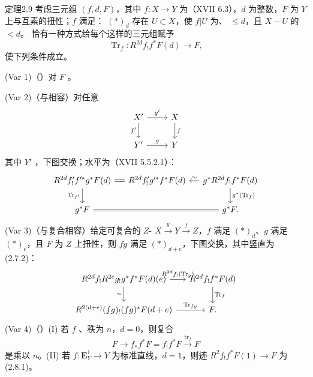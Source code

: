 \begin{SGAresult}{定理}{2.9}
考虑三元组 $(f,d,F)$，其中 $f:X\to Y$ 为（XVII 6.3），$d$ 为整数，$F$ 为 $Y$ 上与互素的扭性；$f$ 满足：
$(*)_d$ 存在 $U\subset X$，使 $f|U$ 为、 $\le d$，且 $X-U$ 的 $<d$。
恰有一种方式给每个这样的三元组赋予
\[\operatorname{Tr}_f:R^{2d}f_!f^*F(d)\to F,\]
使下列条件成立。

(Var 1)（）对 $F$ 。

(Var 2)（与相容）对任意
\[\begin{tikzcd}X'\arrow[r,"g'"]\arrow[d,"f'"']&X\arrow[d,"f"]\\Y'\arrow[r,"g"]&Y\end{tikzcd}\]
其中 $Y'$ ，下图交换；水平为（XVII 5.5.2.1）：
\[\begin{tikzcd}[column sep=small]
R^{2d}f'_!f'^*g^*F(d)\arrow[r,equal]\arrow[d,"\operatorname{Tr}_{f'}"']&R^{2d}f'_!g'^*f^*F(d)&g^*R^{2d}f_!f^*F(d)\arrow[l,"\sim"']\arrow[d,"g^*(\operatorname{Tr}_f)"]\\
g^*F\arrow[rr,equal]&&g^*F.
\end{tikzcd}\]
(Var 3)（与复合相容）给定可复合的 $Z$- $X\xrightarrow gY\xrightarrow fZ$，$f$ 满足 $(*)_d$、$g$ 满足 $(*)_e$，且 $F$ 为 $Z$ 上扭性，则 $fg$ 满足 $(*)_{d+e}$，下图交换，其中竖直为 (2.7.2)：
\[\begin{tikzcd}[column sep=small]
R^{2d}f_!R^{2e}g_!g^*f^*F(d)(e)\arrow[r,"R^{2d}f_!(\operatorname{Tr}_g)"]\arrow[d,"\sim"']&R^{2d}f_!f^*F(d)\arrow[d,"\operatorname{Tr}_f"]\\
R^{2(d+e)}(fg)_!(fg)^*F(d+e)\arrow[r,"\operatorname{Tr}_{fg}"]&F.
\end{tikzcd}\]
(Var 4)（）(I) 若 $f$ 、秩为 $n$，$d=0$，则复合
\[F\to f_*f^*F=f_!f^*F\xrightarrow{\operatorname{tr}_f}F\]
是乘以 $n$。(II) 若 $f:\mathbf E^1_Y\to Y$ 为标准直线，$d=1$，则迹 $R^2f_!f^*F(1)\to F$ 为 (2.8.1)。
\end{SGAresult}
